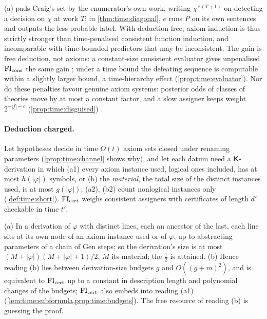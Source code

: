 \noindent {}(a) pads Craig's set by the enumerator's own work, writing $\chi^{\wedge(T+1)}$ on detecting a decision on $\chi$ at work $T$; in \cref{thm:time:diagonal}, $e$ runs $P$ on its own sentences and outputs the less probable label. With deduction free, axiom induction is thus strictly stronger than time-penalised consistent function induction, and incomparable with time-bounded predictors that may be inconsistent. The gain is free deduction, not axioms: a constant-size consistent evaluator gives unpenalised $\mathrm{FI}_{\mathrm{cons}}$ the same gain ; under a time bound the defeating sequence is computable within a slightly larger bound, a time-hierarchy effect  (\cref{prop:time:evaluator}). Nor do these penalties favour genuine axiom systems: posterior odds of classes of theories move by at most a constant factor, and a slow assigner keeps weight $2^{-|f|-c}$ (\cref{prop:time:disguised}) .

\paragraph{Deduction charged.} Let hypotheses decide in time $O(t)$ axiom sets closed under renaming parameters (\cref{prop:time:channel} shows why), and let each datum need a $\mathsf{K}$-derivation in which (a1) every axiom instance used, logical ones included, has at most $h(|\varphi|)$ symbols, or (b) the \emph{material}, the total size of the distinct instances used, is at most $g(|\varphi|)$; (a2), (b2) count nonlogical instances only (\cref{def:time:short}). $\mathrm{FI}_{\mathrm{cert}}$ weighs consistent assigners with certificates of length $d'$ checkable in time $t'$.

\begin{theorem}\label{thm:time:sandwich}
(a) In a derivation of $\varphi$ with distinct lines, each an ancestor of the last, each line sits at its own node of an axiom instance used or of $\varphi$, up to abstracting parameters of a chain of Gen steps; so the derivation's size is at most $(M+|\varphi|)(M+|\varphi|+1)/2$, $M$ its material; the $\tfrac12$ is attained.
(b) Hence reading (b) lies between derivation-size budgets $g$ and $O((g+m)^2)$, and is equivalent to $\mathrm{FI}_{\mathrm{cert}}$ up to a constant in description length and polynomial changes of the budgets; $\mathrm{FI}_{\mathrm{cert}}$ also embeds into reading (a1) (\cref{lem:time:subformula,prop:time:budgets}). The free resource of reading (b) is guessing the proof.
\end{theorem}

